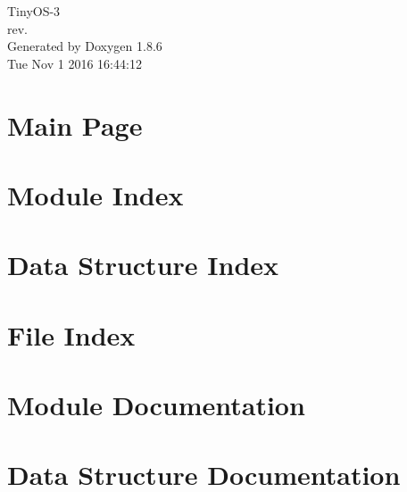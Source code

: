 \documentclass[twoside]{book}
\newcommand{\clearemptydoublepage}{%
  \newpage{\pagestyle{empty}\cleardoublepage}%
}
\begin{document}
\hypersetup{pageanchor=false}
\begin{titlepage}
\vspace*{7cm}
\begin{center}%
{\Large Tiny\-O\-S-\/3 \\[1ex]\large rev. }\\
\vspace*{1cm}
{\large Generated by Doxygen 1.8.6}\\
\vspace*{0.5cm}
{\small Tue Nov 1 2016 16:44:12}\\
\end{center}
\end{titlepage}
\clearemptydoublepage
\tableofcontents
\clearemptydoublepage
{}
\hypersetup{pageanchor=true}

\chapter{Main Page}
\label{index}\hypertarget{index}{}
\chapter{Module Index}

\chapter{Data Structure Index}

\chapter{File Index}

\chapter{Module Documentation}












\chapter{Data Structure Documentation}



















\end{document}
